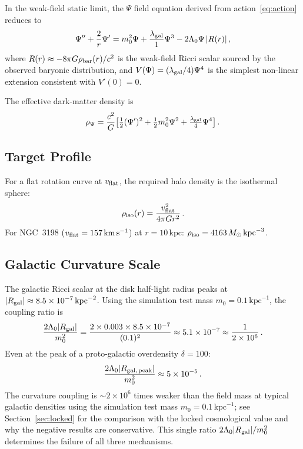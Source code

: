 \documentclass[12pt,a4paper]{article}
\newcommand{\Lz}{\Lambda_0}
\newcommand{\vflat}{v_{\rm flat}}
\theoremstyle{plain}
\begin{document}
In the weak-field static limit, the $\Psi$ field equation derived from
action~\eqref{eq:action} reduces to
\begin{equation}
  \Psi'' + \frac{2}{r}\Psi'
  = m_0^2\Psi + \frac{\lambda_{\rm gal}}{1}\Psi^3
    - 2\Lz\Psi\,|R(r)|\,,
  \label{eq:psi-static}
\end{equation}
where $R(r) \approx -8\pi G\rho_{\rm bar}(r)/c^2$ is the weak-field Ricci
scalar sourced by the observed baryonic distribution, and
$V(\Psi) = (\lambda_{\rm gal}/4)\Psi^4$ is the simplest non-linear extension
consistent with $V'(0) = 0$.

The effective dark-matter density is
\begin{equation}
  \rho_\Psi = \frac{c^2}{G}\bigl[
    \tfrac{1}{2}(\Psi')^2 + \tfrac{1}{2}m_0^2\Psi^2
    + \tfrac{\lambda_{\rm gal}}{4}\Psi^4
  \bigr]\,.
  \label{eq:rho-psi}
\end{equation}

\subsection{Target Profile}

For a flat rotation curve at $\vflat$, the required halo density is the
isothermal sphere:
\begin{equation}
  \rho_{\rm iso}(r) = \frac{\vflat^2}{4\pi G r^2}\,.
  \label{eq:rho-iso}
\end{equation}
For NGC~3198 ($\vflat = 157\,\mathrm{km\,s^{-1}}$) at $r = 10\,\mathrm{kpc}$:
$\rho_{\rm iso} = 4163\,M_\odot\,\mathrm{kpc}^{-3}$.

\subsection{Galactic Curvature Scale}
\label{sec:galcurv}

The galactic Ricci scalar at the disk half-light radius peaks at
$|R_{\rm gal}| \approx 8.5\times10^{-7}\,\mathrm{kpc}^{-2}$. Using the
simulation test mass $m_0 = 0.1\,\mathrm{kpc}^{-1}$, the coupling ratio is
\begin{equation}
  \frac{2\Lz|R_{\rm gal}|}{m_0^2}
  = \frac{2\times0.003\times8.5\times10^{-7}}{(0.1)^2}
  \approx 5.1\times10^{-7} \approx \frac{1}{2\times10^6}\,.
\end{equation}
Even at the peak of a proto-galactic overdensity $\delta = 100$:
\begin{equation}
  \frac{2\Lz|R_{\rm gal,\,peak}|}{m_0^2} \approx 5\times10^{-5}\,.
\end{equation}
The curvature coupling is $\sim2\times10^6$ times weaker than the field mass
at typical galactic densities using the simulation test mass
$m_0 = 0.1\,\mathrm{kpc}^{-1}$; see Section~\ref{sec:locked} for the
comparison with the locked cosmological value and why the negative results
are conservative. This single ratio $2\Lz|R_{\rm gal}|/m_0^2$ determines
the failure of all three mechanisms.
\end{document}
